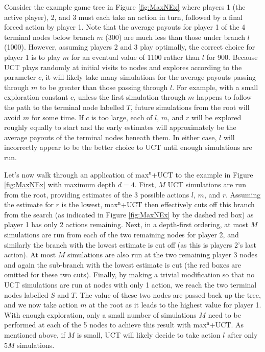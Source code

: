 \documentclass[letterpaper]{article}
\numberwithin{equation}{section}
\numberwithin{theorem}{section}
\numberwithin{lemma}{section}
\numberwithin{df}{section}
\begin{document}
Consider the example game tree in Figure \ref{fig:MaxNEx} where players 1 (the active player), 2, and 3 must each take an action in turn, followed by a final forced action by player 1.  Note that the average payouts for player 1 of the 4 terminal nodes below branch $m$ (300) are much less than those under branch $l$ (1000).  However, assuming players 2 and 3 play optimally, the correct choice for player 1 is to play $m$ for an eventual value of 1100 rather than $l$ for 900.  Because UCT plays randomly at initial visits to nodes and explores according to the parameter $c$, it will likely take many simulations for the average payouts passing through $m$ to be greater than those passing through $l$.  For example, with a small exploration constant $c$, unless the first simulation through $m$ happens to follow the path to the terminal node labelled $T$, future simulations from the root will avoid $m$ for some time.  If $c$ is too large, each of $l$, $m$, and $r$ will be explored roughly equally to start and the early estimates will approximately be the average payouts of the terminal nodes beneath them. In either case, $l$ will incorrectly appear to be the better choice to UCT until enough simulations are run.  

Let's now walk through an application of max$^\text{n}$+UCT to the example in Figure \ref{fig:MaxNEx} with maximum depth $d = 4$.  First, $M$ UCT simulations are run from the root, providing estimates of the 3 possible actions $l$, $m$, and $r$.  Assuming the estimate for $r$ is the lowest, max$^\text{n}$+UCT then effectively cuts off this branch from the search (as indicated in Figure \ref{fig:MaxNEx} by the dashed red box) as player 1 has only 2 actions remaining.  Next, in a depth-first ordering, at most $M$ simulations are run from each of the two remaining nodes for player 2, and similarly the branch with the lowest estimate is cut off (as this is players 2's last action).  At most $M$ simulations are also run at the two remaining player 3 nodes and again the sub-branch with the lowest estimate is cut (the red boxes are omitted for these two cuts).  Finally, by making a trivial modification so that no UCT simulations are run at nodes with only 1 action, we reach the two terminal nodes labelled $S$ and $T$.  The value of these two nodes are passed back up the tree, and we now take action $m$ at the root as it leads to the highest value for player 1.  With enough exploration, only a small number of simulations $M$ need to be performed at each of the 5 nodes to achieve this result with max$^\text{n}$+UCT.  As mentioned above, if $M$ is small, UCT will likely decide to take action $l$ after only $5M$ simulations.
\end{document}
